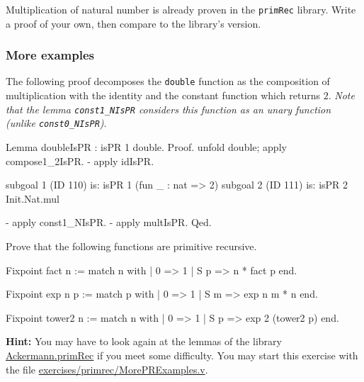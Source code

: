 \begin{exercise}
Multiplication of natural number is already proven in the \texttt{primRec} library. Write a proof of your own, then compare to the library's version.
\end{exercise}

\subsubsection{More examples}

The following proof decomposes the \texttt{double} function as the composition of 
multiplication with the identity and the constant function which returns $2$.
\emph{Note that the lemma \texttt{const1\_NIsPR} considers this function as an unary function (unlike \texttt{const0\_NIsPR})}. 

\begin{Coqsrc}
Lemma doubleIsPR : isPR 1 double.
Proof.
  unfold double; apply compose1_2IsPR.
  - apply idIsPR.
\end{Coqsrc}

\begin{Coqanswer}
subgoal 1 (ID 110) is:
 isPR 1 (fun _ : nat => 2)
subgoal 2 (ID 111) is:
 isPR 2 Init.Nat.mul
\end{Coqanswer}

 \begin{Coqsrc}
  - apply const1_NIsPR.
  - apply multIsPR.
Qed.
\end{Coqsrc}

\begin{exercise}
Prove that the following functions are primitive recursive. 

\begin{Coqsrc}
Fixpoint fact n :=
  match n with 
          | 0 => 1
          | S p  => n * fact p
  end.

Fixpoint exp n p :=
  match p with
  | 0 => 1
  | S m =>  exp n m * n
  end.

Fixpoint tower2 n :=
  match n with
  | 0 => 1
  | S p => exp 2 (tower2 p)
  end.
\end{Coqsrc}



\textbf{Hint:} You may have to look again at the lemmas of the library
\href{../theories/html/hydras.Ackermann.primRec.html}{Ackermann.primRec} if you meet some difficulty.
You may start this exercise with the file
    \href{https://https://github.com/coq-community/hydra-battles/blob/master/exercises/primrec/MorePRExamples.v}{exercises/primrec/MorePRExamples.v}.
\end{exercise}



